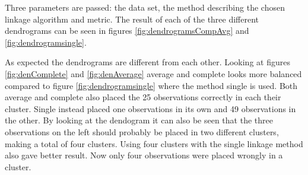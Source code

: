 Three parameters are passed: the data set, the method describing the chosen linkage algorithm and metric. The result of each of the three different dendrograms can be seen in figures \ref{fig:dendrogramsCompAvg} and \ref{fig:dendrogramsingle}.







As expected the dendrograms are different from each other.
Looking at figures \ref{fig:denComplete} and \ref{fig:denAverage} average and complete looks more balanced compared to figure \ref{fig:dendrogramsingle} where the method single is used. Both average and complete also placed the 25 observations correctly in each their cluster. Single instead placed one observations in its own and 49 observations in the other. By looking at the dendogram it can also be seen that the three observations on the left should probably be placed in two different clusters, making a total of four clusters. Using four clusters with the single linkage method also gave better result. Now only four observations were placed wrongly in a cluster.